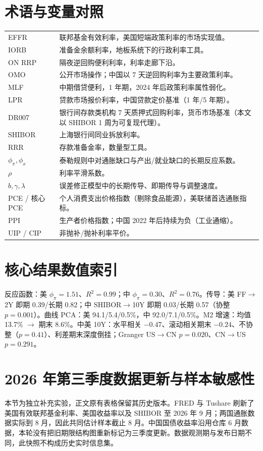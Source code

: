 \documentclass[12pt,a4paper]{ctexart}
\begin{document}
\section{术语与变量对照}
\begin{longtable}{@{}P{3.2cm}P{11cm}@{}}
EFFR & 联邦基金有效利率，美国短端政策利率的市场实现值。\\
IORB & 准备金余额利率，地板系统下的行政利率工具。\\
ON RRP & 隔夜逆回购便利利率，利率走廊下沿。\\
OMO & 公开市场操作；中国以 7 天逆回购利率为主要政策利率。\\
MLF & 中期借贷便利，1 年期，2024 年后政策利率属性弱化。\\
LPR & 贷款市场报价利率，中国贷款定价基准（1 年/5 年期）。\\
DR007 & 银行间存款类机构 7 天质押式回购利率，货币市场基准（本文以 SHIBOR 1 周为可复现代理）。\\
SHIBOR & 上海银行间同业拆放利率。\\
RRR & 存款准备金率，数量型工具。\\
$\phi_\pi,\phi_x$ & 泰勒规则中对通胀缺口与产出/就业缺口的长期反应系数。\\
$\rho$ & 利率平滑系数。\\
$b,\gamma,\lambda$ & 误差修正模型中的长期传导、即期传导与调整速度。\\
PCE / 核心 PCE & 个人消费支出价格指数（剔除食品能源），美联储首选通胀指标。\\
PPI & 生产者价格指数；中国 2022 年后持续为负（工业通缩）。\\
UIP / CIP & 非抛补/抛补利率平价。\\
\end{longtable}

\section{核心结果数值索引}
反应函数：美 $\phi_\pi=1.51$、$R^2=0.99$；中 $\phi_\pi=0.30$、$R^2=0.76$。传导：美 FF$\to$2Y 即期 0.39/长期 0.82；中 SHIBOR$\to$10Y 即期 0.03/长期 0.57（协整 $p=0.001$）。曲线 PCA：美 94.1/5.4/0.5\%，中 92.0/7.1/0.5\%。M2 增速：均值 13.7\% $\to$ 期末 8.6\%。中美 10Y：水平相关 $-0.47$、滚动相关期末 $-0.24$、不协整（$p=0.41$）、利差期末深度倒挂；Granger US$\to$CN $p=0.020$、CN$\to$US $p=0.291$。

\clearpage
\section{2026 年第三季度数据更新与样本敏感性}
本节为独立补充实验，正文原有表格保留其历史版本。FRED 与 Tushare 刷新了美国有效联邦基金利率、美国收益率以及 SHIBOR 至 2026 年 9 月；两国通胀数据实际到 8 月，因此共同估计样本截止 8 月。中国国债收益率沿用仓库 6 月数据，本轮没有把旧期限结构图重新标记为三季度更新。数据观测期与发布日期不同，此快照不构成历史实时信息集。
\end{document}
